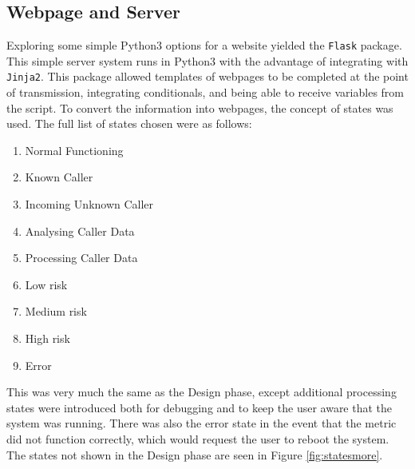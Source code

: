 \documentclass[main.tex]{subfiles}
\begin{document}
\subsection{Webpage and Server}
Exploring some simple Python3 options for a website yielded the \texttt{Flask} package. This simple server system runs in Python3 with the advantage of integrating with \texttt{Jinja2}. This package allowed templates of webpages to be completed at the point of transmission, integrating conditionals, and being able to receive variables from the script. To convert the information into webpages, the concept of states was used. The full list of states chosen were as follows:

\begin{enumerate}
	\item Normal Functioning
	\item Known Caller
	\item Incoming Unknown Caller
	\item Analysing Caller Data
	\item Processing Caller Data
	\item Low risk
	\item Medium risk
	\item High risk
	\item Error
\end{enumerate}

This was very much the same as the Design phase, except additional processing states were introduced both for debugging and to keep the user aware that the system was running. There was also the error state in the event that the metric did not function correctly, which would request the user to reboot the system. The states not shown in the Design phase are seen in Figure \ref{fig:statesmore}.
\end{document}
